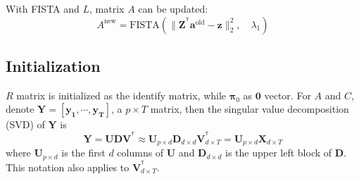 \documentclass[fleqn]{article}
\newcommand{\T}{^{\ensuremath{\mathsf{T}}}}           %
\begin{document}
%
%



With FISTA and $L$, matrix $A$ can be updated:
\begin{equation}\label{eq:updatea}
A^{\text{new}} = \text{FISTA}(\|\mathbf{Z}^{\T}\mathbf{a}^{\text{old}} -\mathbf{z}\|_2^2,\quad \lambda_1)
\end{equation}

\subsection{Initialization}\label{sec:initial}
$R$ matrix is initialized as the identify matrix, while $\mathbf{\pi}_0$ as $\mathbf{0}$ vector. For $A$ and $C$, denote $\mathbf{Y} = \left[\mathbf{y_1},\cdots,\mathbf{y_T}\right]$, a $p\times T$ matrix, then the singular value decomposition (SVD) of $\mathbf{Y}$ is
\begin{equation}\label{eq:initial}
    \mathbf{Y} = \mathbf{UDV^{\T}} \approx \mathbf{U}_{p \times d} \mathbf{D}_{d \times d} \mathbf{V}_{d \times T}^{\T} =\mathbf{U}_{p\times d}\mathbf{X}_{d \times T}
\end{equation}
where $\mathbf{U}_{p \times d}$ is the first $d$ columns of $\mathbf{U}$ and $\mathbf{D}_{d\times d}$ is the upper left block of $\mathbf{D}$. This notation also applies to $\mathbf{V}^{\T}_{d \times T}$.
\end{document}
